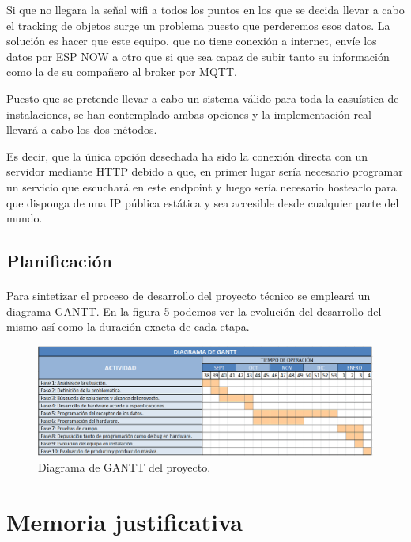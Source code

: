 \documentclass[paper=a4, fontsize=11pt,twoside]{scrartcl}	%
\begin{document}
        Si que no llegara la señal wifi a todos los puntos en los que se decida llevar a cabo el tracking de objetos 
        surge un problema puesto que perderemos esos datos. La solución es hacer que este equipo, que no tiene conexión a internet,
        envíe los datos por ESP NOW a otro que si que sea capaz de subir tanto su información como la de su compañero al broker por MQTT.

        Puesto que se pretende llevar a cabo un sistema válido para toda la casuística de instalaciones, se han contemplado ambas opciones
        y la implementación real llevará a cabo los dos métodos.
        
        Es decir, que la única opción desechada ha sido la conexión directa con un servidor mediante HTTP debido a que, en primer
        lugar sería necesario programar un servicio que escuchará en este endpoint y luego sería necesario hostearlo 
        para que disponga de una IP pública estática y sea accesible desde cualquier parte del mundo.
    \subsection{Planificación}
        \paragraph{}
        Para sintetizar el proceso de desarrollo del proyecto técnico se empleará un diagrama GANTT. En la
        figura 5 podemos ver la evolución del desarrollo del mismo así como la duración exacta de cada etapa. 
        \begin{center}
            \begin{figure}[H]
                \centering
                \includegraphics[width=1\textwidth]{diagrama de gantt.PNG}
                \caption{Diagrama de GANTT del proyecto.}
                \label{fig:mesh18}
            \end{figure}
        \end{center} 
\section{Memoria justificativa}
\end{document}
